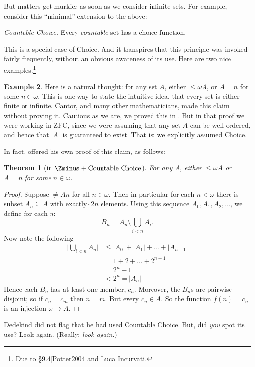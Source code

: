\documentclass[10pt,a4paper]{article}
\makeatletter
\theoremstyle{plain}
\newtheorem{thm}{Theorem}[section]
\theoremstyle{definition}
\newtheorem{ex}[thm]{Example}
\theoremstyle{remark}
\newcommand{\olref}{\@ifnextchar[{\olref@i}{\olref@final}}
\def\olref@i[#1]{\@ifnextchar[{\olref@ii}{\olref@final}}
\def\olref@ii[#1]{\@ifnextchar[{\olref@iii}{\olref@final}}
\def\olref@iii[#1]{\olref@final}
\def\olref@final#1{\ref{#1}}
\providecommand{\cardexpo}{\mathbin{\hat{\ }}}
\providecommand{\cardle}{\leq}
\providecommand{\ZFC}{\mathrm{ZFC}}
\providecommand{\card}[1]{\lvert #1 \rvert}
\providecommand{\citet}[1]{\cite{#1}}
\providecommand{\cardneq}{\neq}
\providecommand{\cardeq}[2]{#1 = #2}
\providecommand{\cardexpo}{\mathbin{\hat{\ }}}
\providecommand{\cardneq}{\neq}
\providecommand{\cardle}{\leq}
\makeatother
\begin{document}
But matters get murkier as soon as we consider infinite sets. For
example, consider this ``minimal'' extension to the above:

\begin{defish}
\emph{Countable Choice.} Every \emph{countable} set has a choice function. 
\end{defish}

This is a special case of Choice. And it transpires that this
principle was invoked fairly frequently, without  an obvious awareness
of its use. Here are two nice examples.\footnote{Due to
\citet[\S9.4]{Potter2004} and Luca Incurvati.}

\begin{ex}
Here is a natural thought: for any set $A$, either
$\cardle{\omega}{A}$, or $\cardeq{A}{n}$ for some $n \in \omega$. This
is one way to state the intuitive idea, that every set is either
finite or infinite. Cantor, and many other mathematicians, made this
claim without proving it. Cautious as we are, we proved this in
\olref[cardinals][classing]{generalinfinitycharacter}. But
in that proof we were working in $\ZFC$, since we were assuming that
any set $A$ can be well-ordered, and hence that $\card{A}$ is
guaranteed to exist. That is: we explicitly assumed Choice.

In fact, \citet{Dedekind1888} offered his own proof of
this claim, as follows:

\begin{thm}[in $\Zminus + \text{Countable Choice}$]
For any $A$, either $\cardle{\omega}{A}$ or $\cardeq{A}{n}$ for some
$n \in \omega$.
\end{thm}

\begin{proof}
Suppose $\cardneq{A}{n}$ for all $n \in \omega$. Then in particular
for each $n < \omega$ there is subset $A_n \subseteq A$ with exactly
$\cardexpo{2}{n}$ elements. Using this sequence $A_0, A_1, A_2,
\ldots$, we define for each $n$:
\[
	B_n = A_n \setminus \bigcup_{i < n} A_i.
\]
Now note the following
\begin{align*}
	\card{\bigcup_{i < n}A_n} 
	&\leq \card{A_0} + \card{A_1} + \ldots + \card{A_{n-1}}\\
	&=1 + 2 + \ldots + 2^{n-1}\\
	& = 2^n - 1\\
	& < 2^n = \card{A_n}
\end{align*}
Hence each $B_n$ has at least one member, $c_n$. Moreover, the $B_n$s
are pairwise disjoint; so if $c_n = c_m$ then $n = m$. But every $c_n
\in A$. So the function  $f(n) = c_n$ is an injection $\omega \to A$.
\end{proof}
\noindent 
Dedekind did not flag that he had used Countable Choice. But, did
\emph{you} spot its use? Look again. (Really: \emph{look again}.)


\end{ex}
\end{document}
